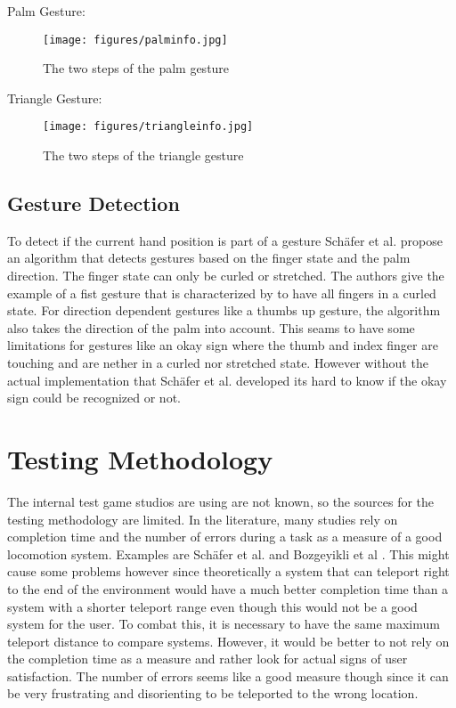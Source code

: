 Palm Gesture:
\begin{figure}[!ht]
    \centering
    \texttt{[image: figures/palminfo.jpg]}
    \caption{The two steps of the palm gesture}
    \label{fig:palmInfo}
\end{figure}

Triangle Gesture:
\begin{figure}[!ht]
    \centering
    \texttt{[image: figures/triangleinfo.jpg]}
    \caption{The two steps of the triangle gesture}
    \label{fig:triangleInfo}
\end{figure}

\subsection{Gesture Detection}
To detect if the current hand position is part of a gesture Schäfer et al. \cite{Schafer2021} propose an algorithm
that detects gestures based on the finger state and the palm direction. The finger state can only be curled or
stretched. The authors give the example of a fist gesture that is characterized by to have all fingers in a curled
state. For direction dependent gestures like a thumbs up gesture, the algorithm also takes the direction of the
palm into account. This seams to have some limitations for gestures like an okay sign where the thumb and index
finger are touching and are nether in a curled nor stretched state. However without the actual implementation that
Schäfer et al. developed its hard to know if the okay sign could be recognized or not.

\section{Testing Methodology}
The internal test game studios are using are not known, so the sources for the testing methodology are limited. In the literature, many studies rely on completion time and the number of errors during a task as a measure of a good locomotion system. Examples are Schäfer et al. \cite{Schafer2021} and Bozgeyikli et al \cite{bozgeyikli}.
This might cause some problems however since theoretically a system that can teleport right to the end of the environment would have a much better completion time than a system with a shorter teleport range even though this would not be a good system for the user. To combat this, it is necessary to have the same maximum teleport distance to compare systems. However, it would be better to not rely on the completion time as a measure and rather look for actual signs of user satisfaction. The number of errors seems like a good measure though since it can be very frustrating and disorienting to be teleported to the wrong location. 

